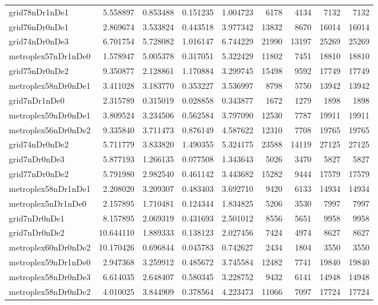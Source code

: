 \begin{longtable}{|l|r|r|r|r|r|r|r|r|}
grid78nDr1nDe1 & 5.558897 & 0.853488 & 0.151235 & 1.004723 & 6178 & 4134 & 7132 & 7132 \\
grid76nDr0nDe1 & 2.869674 & 3.533824 & 0.443518 & 3.977342 & 13832 & 8670 & 16014 & 16014 \\
grid74nDr0nDe3 & 6.701754 & 5.728082 & 1.016147 & 6.744229 & 21990 & 13197 & 25269 & 25269 \\
metroplex57nDr1nDe0 & 1.578947 & 5.005378 & 0.317051 & 5.322429 & 11802 & 7451 & 18810 & 18810 \\
grid75nDr0nDe2 & 9.350877 & 2.128861 & 1.170884 & 3.299745 & 15498 & 9592 & 17749 & 17749 \\
metroplex58nDr0nDe1 & 3.411028 & 3.183770 & 0.353227 & 3.536997 & 8798 & 5750 & 13942 & 13942 \\
grid7nDr1nDe0 & 2.315789 & 0.315019 & 0.028858 & 0.343877 & 1672 & 1279 & 1898 & 1898 \\
metroplex59nDr0nDe1 & 3.809524 & 3.234506 & 0.562584 & 3.797090 & 12530 & 7787 & 19911 & 19911 \\
metroplex56nDr0nDe2 & 9.335840 & 3.711473 & 0.876149 & 4.587622 & 12310 & 7708 & 19765 & 19765 \\
grid74nDr0nDe2 & 5.711779 & 3.833820 & 1.490355 & 5.324175 & 23588 & 14119 & 27125 & 27125 \\
grid7nDr0nDe3 & 5.877193 & 1.266135 & 0.077508 & 1.343643 & 5026 & 3470 & 5827 & 5827 \\
grid77nDr0nDe2 & 5.791980 & 2.982540 & 0.461142 & 3.443682 & 15282 & 9444 & 17579 & 17579 \\
metroplex58nDr1nDe1 & 2.208020 & 3.209307 & 0.483403 & 3.692710 & 9420 & 6133 & 14934 & 14934 \\
metroplex5nDr1nDe0 & 2.157895 & 1.710481 & 0.124344 & 1.834825 & 5206 & 3530 & 7997 & 7997 \\
grid7nDr0nDe1 & 8.157895 & 2.069319 & 0.431693 & 2.501012 & 8556 & 5651 & 9958 & 9958 \\
grid7nDr0nDe2 & 10.644110 & 1.889333 & 0.138123 & 2.027456 & 7424 & 4974 & 8627 & 8627 \\
metroplex60nDr0nDe2 & 10.170426 & 0.696844 & 0.045783 & 0.742627 & 2434 & 1804 & 3550 & 3550 \\
metroplex59nDr1nDe0 & 2.947368 & 3.259912 & 0.485672 & 3.745584 & 12482 & 7741 & 19840 & 19840 \\
metroplex58nDr0nDe3 & 6.614035 & 2.648407 & 0.580345 & 3.228752 & 9432 & 6141 & 14948 & 14948 \\
metroplex58nDr0nDe2 & 4.010025 & 3.844909 & 0.378564 & 4.223473 & 11066 & 7097 & 17724 & 17724 \\

\end{longtable}
